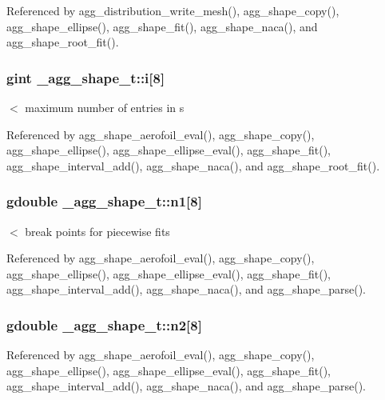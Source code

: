 Referenced by agg\+\_\+distribution\+\_\+write\+\_\+mesh(), agg\+\_\+shape\+\_\+copy(), agg\+\_\+shape\+\_\+ellipse(), agg\+\_\+shape\+\_\+fit(), agg\+\_\+shape\+\_\+naca(), and agg\+\_\+shape\+\_\+root\+\_\+fit().

\subsubsection[{i}]{\setlength{\rightskip}{0pt plus 5cm}gint \+\_\+agg\+\_\+shape\+\_\+t\+::i[8]}\label{struct__agg__shape__t_a7384fd93ef6af794dcd7c732caf73dc7}
$<$ maximum number of entries in s 

Referenced by agg\+\_\+shape\+\_\+aerofoil\+\_\+eval(), agg\+\_\+shape\+\_\+copy(), agg\+\_\+shape\+\_\+ellipse(), agg\+\_\+shape\+\_\+ellipse\+\_\+eval(), agg\+\_\+shape\+\_\+fit(), agg\+\_\+shape\+\_\+interval\+\_\+add(), agg\+\_\+shape\+\_\+naca(), and agg\+\_\+shape\+\_\+root\+\_\+fit().

\subsubsection[{n1}]{\setlength{\rightskip}{0pt plus 5cm}gdouble \+\_\+agg\+\_\+shape\+\_\+t\+::n1[8]}\label{struct__agg__shape__t_a32b3638058220bc74531baa158e78823}
$<$ break points for piecewise fits 

Referenced by agg\+\_\+shape\+\_\+aerofoil\+\_\+eval(), agg\+\_\+shape\+\_\+copy(), agg\+\_\+shape\+\_\+ellipse(), agg\+\_\+shape\+\_\+ellipse\+\_\+eval(), agg\+\_\+shape\+\_\+fit(), agg\+\_\+shape\+\_\+interval\+\_\+add(), agg\+\_\+shape\+\_\+naca(), and agg\+\_\+shape\+\_\+parse().

\subsubsection[{n2}]{\setlength{\rightskip}{0pt plus 5cm}gdouble \+\_\+agg\+\_\+shape\+\_\+t\+::n2[8]}\label{struct__agg__shape__t_aa703821d004c29d7f1e87b03770208ac}


Referenced by agg\+\_\+shape\+\_\+aerofoil\+\_\+eval(), agg\+\_\+shape\+\_\+copy(), agg\+\_\+shape\+\_\+ellipse(), agg\+\_\+shape\+\_\+ellipse\+\_\+eval(), agg\+\_\+shape\+\_\+fit(), agg\+\_\+shape\+\_\+interval\+\_\+add(), agg\+\_\+shape\+\_\+naca(), and agg\+\_\+shape\+\_\+parse().


